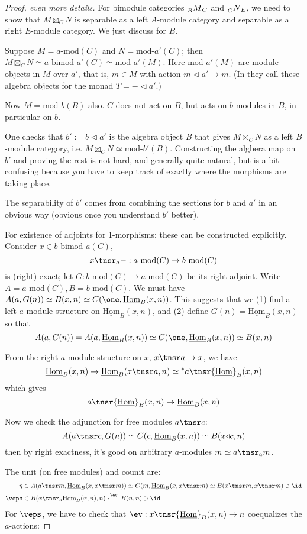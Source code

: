 \documentclass[12pt]{article}
\newcommand{\bimod}[2]{{#1\textrm{-bimod-}#2}}
\newcommand{\amod}[1]{{#1\textrm{-mod}}}
\newcommand{\moda}[1]{{\textrm{mod-}#1}}
\newcommand{\ihom}{{\underline{\textrm{Hom}}}}
\newcommand{\ract}{{\triangleleft}}
\begin{document}
\begin{proof}[Proof, even more details]
For bimodule categories $\prescript{}{B}M_C$
and $\prescript{}{C}N_E$,
we need to show that
$M \boxtimes_C N$ is separable as a left $A$-module category
and separable as a right $E$-module category.
We just discuss for $B$.

Suppose $M = \amod{a}(C)$ and $N = \moda{a'}(C)$;
then $M \boxtimes_C N \simeq \bimod{a}{a'}(C)
\simeq \moda{a'}(M)$.
Here $\moda{a'}(M)$ are module objects in $M$ over $a'$,
that is, $m \in M$
with action $m \ract a' \to m$.
(In \cite{DSPSb} they call these
algebra objects for the monad $T = - \ract a'$.)

Now $M = \moda{b}(B)$ also.
$C$ does not act on $B$, but acts on $b$-modules in $B$,
in particular on $b$.

One checks that $b' := b \ract a'$
is the algebra object $B$ that gives $M \boxtimes_C N$
as a left $B$-module category,
i.e. $M \boxtimes_C N \simeq \moda{b'}(B)$.
Constructing the algbera map on $b'$
and proving the rest is not hard,
and generally quite natural,
but is a bit confusing because you have to keep track
of exactly where the morphisms are taking place.

The separability of $b'$
comes from combining the sections for $b$ and $a'$
in an obvious way (obvious once you understand $b'$ better).


For existence of adjoints for 1-morphisms:
these can be constructed explicitly.
Consider $x \in \bimod{b}{a}(C)$,
\[
x \tnsr_a - : \amod{a}(C) \to \amod{b}(C)
\]
is (right) exact;
let $G: \amod{b}(C) \to \amod{a}(C)$
be its right adjoint.
Write $A = \amod{a}(C), B = \amod{b}(C)$.
We must have $A(a, G(n)) \simeq B(x, n)
\simeq C(\one, \ihom_B(x,n))$.
This suggests that we (1) find a left $a$-module
structure on $\ihom_B(x,n)$, and
(2) define $G(n) = \ihom_B(x,n)$
so that
\[
A(a,G(n)) = A(a,\ihom_B(x,n)) \simeq C(\one,\ihom_B(x,n))
\simeq B(x,n)
\]

From the right $a$-module structure on $x$,
$x \tnsr a \to x$,
we have
\[
\ihom_B(x,n) \to \ihom_B(x \tnsr a,n)
\simeq \prescript{*}{}a \tnsr \ihom_B(x,n)
\]
which gives
\[
a \tnsr \ihom_B(x,n) \to \ihom_B(x,n)
\]

Now we check the adjunction for free modules
$a \tnsr c$:
\[
A(a \tnsr c, G(n))
\simeq C(c, \ihom_B(x,n))
\simeq B(x \ract c, n)
\]
then by right exactness, it's good on arbitrary
$a$-modules $m \simeq a \tnsr_a m$.

The unit (on free modules) and counit are:
\begin{align*}
\eta &\in A(a \tnsr m,\ihom_B(x,x \tnsr m))
\simeq C(m, \ihom_B(x, x \tnsr m)
\simeq B(x \tnsr m, x \tnsr m) \ni \id
\\
\veps &\in B(x \tnsr_a \ihom_B(x,n), n)
\xleftarrow{\ev} B(n,n) \ni \id
\end{align*}
For $\veps$, we have to check that
$\ev: x \tnsr \ihom_B(x,n) \to n$
coequalizes the $a$-actions:


\end{proof}
\end{document}
